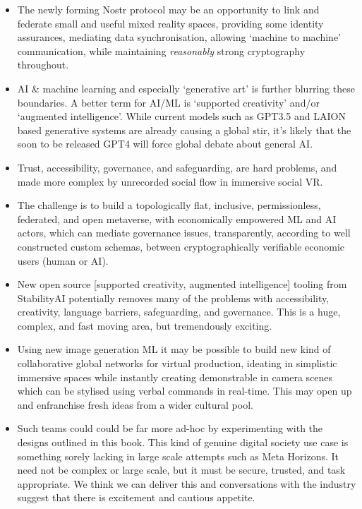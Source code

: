 \begin{itemize}
\item The newly forming Nostr protocol may be an opportunity to link and federate small and useful mixed reality spaces, providing some identity assurances, mediating data synchronisation, allowing `machine to machine' communication, while maintaining \textit{reasonably} strong cryptography throughout.
\item AI \& machine learning and especially `generative art' is further blurring these boundaries. A better term for AI/ML is `supported creativity' and/or `augmented intelligence'. While current models such as GPT3.5 and LAION based generative systems are already causing a global stir, it's likely that the soon to be released GPT4 will force global debate about general AI.
\item Trust, accessibility, governance, and safeguarding, are hard problems, and made more complex by unrecorded social flow in immersive social VR.
\item The challenge is to build a topologically flat, inclusive, permissionless, federated, and open metaverse, with economically empowered ML and AI actors, which can mediate governance issues, transparently, according to well constructed custom schemas, between cryptographically verifiable economic users (human or AI).
\item New open source [supported creativity, augmented intelligence] tooling from StabilityAI potentially removes many of the problems with accessibility, creativity, language barriers, safeguarding, and governance. This is a huge, complex, and fast moving area, but tremendously exciting. 
\item Using new image generation ML it may be possible to build new kind of collaborative global networks for virtual production, ideating in simplistic immersive spaces while instantly creating demonstrable in camera scenes which can be stylised using verbal commands in real-time. This may open up and enfranchise fresh ideas from a wider cultural pool.
\item Such teams could could be far more ad-hoc by experimenting with the designs outlined in this book. This kind of genuine digital society use case is something sorely lacking in large scale attempts such as Meta Horizons. It need not be complex or large scale, but it must be secure, trusted, and task appropriate. We think we can deliver this and conversations with the industry suggest that there is excitement and cautious appetite. 
\end{itemize}

